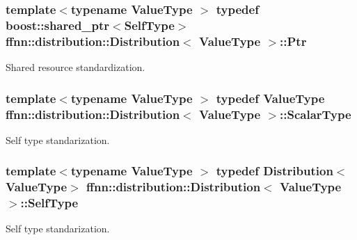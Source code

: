 \hypertarget{classffnn_1_1distribution_1_1_distribution_a51d4ea875b70b07862c5f68b20c8f41a}{
\subsubsection[{Ptr}]{\setlength{\rightskip}{0pt plus 5cm}template$<$typename Value\-Type $>$ typedef boost\-::shared\-\_\-ptr$<${\bf Self\-Type}$>$ {\bf ffnn\-::distribution\-::\-Distribution}$<$ Value\-Type $>$\-::{\bf Ptr}}}\label{classffnn_1_1distribution_1_1_distribution_a51d4ea875b70b07862c5f68b20c8f41a}


Shared resource standardization. 

\hypertarget{classffnn_1_1distribution_1_1_distribution_ad62797f0dcb4bb4698bdf17e3f3b07bb}{
\subsubsection[{Scalar\-Type}]{\setlength{\rightskip}{0pt plus 5cm}template$<$typename Value\-Type $>$ typedef Value\-Type {\bf ffnn\-::distribution\-::\-Distribution}$<$ Value\-Type $>$\-::{\bf Scalar\-Type}}}\label{classffnn_1_1distribution_1_1_distribution_ad62797f0dcb4bb4698bdf17e3f3b07bb}


Self type standarization. 

\hypertarget{classffnn_1_1distribution_1_1_distribution_ae1a3da8f16a034d6c051fcfdcf69f0d2}{
\subsubsection[{Self\-Type}]{\setlength{\rightskip}{0pt plus 5cm}template$<$typename Value\-Type $>$ typedef {\bf Distribution}$<$Value\-Type$>$ {\bf ffnn\-::distribution\-::\-Distribution}$<$ Value\-Type $>$\-::{\bf Self\-Type}}}\label{classffnn_1_1distribution_1_1_distribution_ae1a3da8f16a034d6c051fcfdcf69f0d2}


Self type standarization. 



